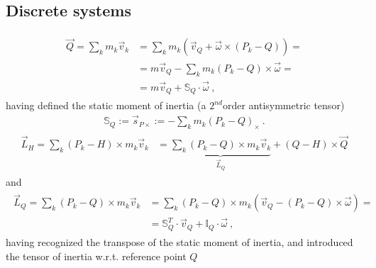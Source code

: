 \documentclass[letterpaper,10pt,english]{jupyterBook}
\begin{document}
\subsection{Discrete systems}
\label{\detokenize{ch/inertia:discrete-systems}}
\sphinxAtStartPar
{}
\begin{equation*}
\begin{split}\begin{aligned}
  \vec{Q} = \sum_k m_k \vec{v}_k 
  & = \sum_k m_k \left( \vec{v}_Q + \vec{\omega} \times (P_k - Q) \right) = \\
  & = m \vec{v}_Q - \sum_k m_k (P_k - Q) \times \vec{\omega} = \\
  & = m \vec{v}_Q + \mathbb{S}_Q \cdot \vec{\omega} \ ,
\end{aligned}\end{split}
\end{equation*}
\sphinxAtStartPar
having defined the static moment of inertia (a \(2^{nd}\)\sphinxhyphen{}order antisymmetric tensor)
\begin{equation*}
\begin{split}\mathbb{S}_Q := \vec{s}_{P \times} := - \sum_k m_k (P_k - Q)_{\times} \ .\end{split}
\end{equation*}
\sphinxAtStartPar
{}
\begin{equation*}
\begin{split}\begin{aligned}
  \vec{L}_H = \sum_k (P_k-H) \times  m_k \vec{v}_k 
  & = \underbrace{\sum_k (P_k-Q) \times m_k \vec{v}_k}_{\vec{L}_Q} + (Q - H) \times \vec{Q}
\end{aligned}\end{split}
\end{equation*}
\sphinxAtStartPar
and
\begin{equation*}
\begin{split}\begin{aligned}
\vec{L}_Q = \sum_k (P_k - Q) \times m_k \vec{v}_k 
 & = \sum_k (P_k - Q) \times m_k \left( \vec{v}_Q - (P_k - Q) \times \vec{\omega} \right) = \\
 & = \mathbb{S}_Q^T \cdot \vec{v}_Q + \mathbb{I}_Q \cdot \vec{\omega}  \ ,
\end{aligned}\end{split}
\end{equation*}
\sphinxAtStartPar
having recognized the transpose of the static moment of inertia, and introduced the tensor of inertia w.r.t. reference point \(Q\)
\end{document}
